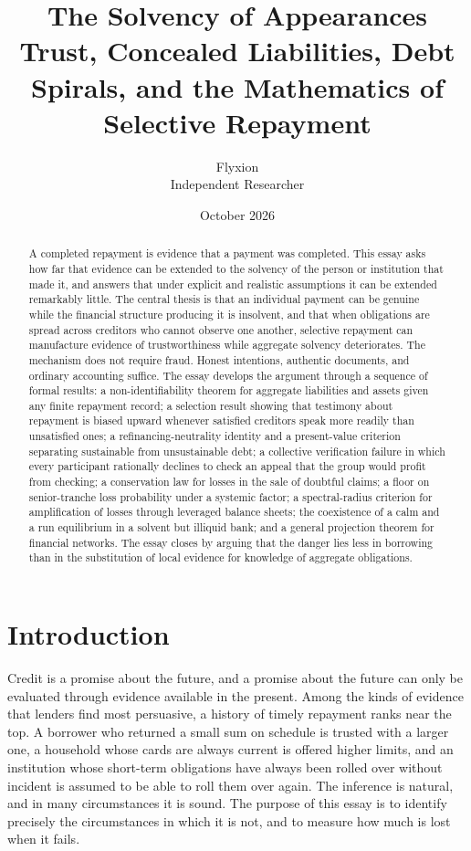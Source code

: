 \documentclass[11pt]{article}
\title{The Solvency of Appearances\\[0.4em]
\large Trust, Concealed Liabilities, Debt Spirals, and the Mathematics of Selective Repayment}
\author{Flyxion\\ Independent Researcher}
\date{October 2026}
\theoremstyle{definition}
\theoremstyle{remark}
\begin{document}
\maketitle

\begin{abstract}
\noindent A completed repayment is evidence that a payment was completed. This essay asks how far that evidence can be extended to the solvency of the person or institution that made it, and answers that under explicit and realistic assumptions it can be extended remarkably little. The central thesis is that an individual payment can be genuine while the financial structure producing it is insolvent, and that when obligations are spread across creditors who cannot observe one another, selective repayment can manufacture evidence of trustworthiness while aggregate solvency deteriorates. The mechanism does not require fraud. Honest intentions, authentic documents, and ordinary accounting suffice. The essay develops the argument through a sequence of formal results: a non-identifiability theorem for aggregate liabilities and assets given any finite repayment record; a selection result showing that testimony about repayment is biased upward whenever satisfied creditors speak more readily than unsatisfied ones; a refinancing-neutrality identity and a present-value criterion separating sustainable from unsustainable debt; a collective verification failure in which every participant rationally declines to check an appeal that the group would profit from checking; a conservation law for losses in the sale of doubtful claims; a floor on senior-tranche loss probability under a systemic factor; a spectral-radius criterion for amplification of losses through leveraged balance sheets; the coexistence of a calm and a run equilibrium in a solvent but illiquid bank; and a general projection theorem for financial networks. The essay closes by arguing that the danger lies less in borrowing than in the substitution of local evidence for knowledge of aggregate obligations.
\end{abstract}

\tableofcontents
\newpage

\section{Introduction}

Credit is a promise about the future, and a promise about the future can only be evaluated through evidence available in the present. Among the kinds of evidence that lenders find most persuasive, a history of timely repayment ranks near the top. A borrower who returned a small sum on schedule is trusted with a larger one, a household whose cards are always current is offered higher limits, and an institution whose short-term obligations have always been rolled over without incident is assumed to be able to roll them over again. The inference is natural, and in many circumstances it is sound. The purpose of this essay is to identify precisely the circumstances in which it is not, and to measure how much is lost when it fails.
\end{document}
